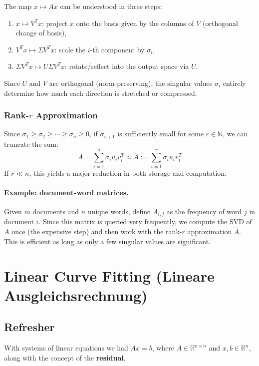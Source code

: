 \documentclass{article}
\begin{document}
The map $x \mapsto Ax$ can be understood in three steps:
\begin{enumerate}
  \item $x \mapsto V^T x$: project $x$ onto the basis given by the columns of $V$ (orthogonal change of basis),
  \item $V^T x \mapsto \Sigma V^T x$: scale the $i$-th component by $\sigma_i$,
  \item $\Sigma V^T x \mapsto U\Sigma V^T x$: rotate/reflect into the output space via $U$.
\end{enumerate}
Since $U$ and $V$ are orthogonal (norm-preserving), the singular values $\sigma_i$ entirely determine how much each direction is stretched or compressed.

\subsubsection{Rank-$r$ Approximation}
Since $\sigma_1 \geq \sigma_2 \geq \cdots \geq \sigma_n \geq 0$, if $\sigma_{r+1}$ is sufficiently small for some $r \in \mathbb{N}$, we can truncate the sum:
\[
A = \sum_{i=1}^{n} \sigma_i u_i v_i^T \approx \tilde{A} := \sum_{i=1}^{r} \sigma_i u_i v_i^T
\]
If $r \ll n$, this yields a major reduction in both storage and computation.

\paragraph{Example: document-word matrices.}
Given $m$ documents and $n$ unique words, define $A_{i,j}$ as the frequency of word $j$ in document $i$. Since this matrix is queried very frequently, we compute the SVD of $A$ once (the expensive step) and then work with the rank-$r$ approximation $\tilde{A}$. This is efficient as long as only a few singular values are significant.

\section{Linear Curve Fitting (Lineare Ausgleichsrechnung)}

\subsection{Refresher}
With systems of linear equations we had $Ax = b$, where $A \in \mathbb{R}^{n\times n}$
and $x, b \in \mathbb{R}^n$, along with the concept of the \textbf{residual}.
\end{document}
